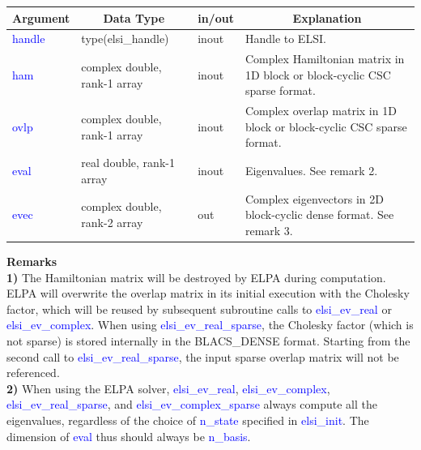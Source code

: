 \documentclass{report}
\begin{document}
\begin{table}[h]
\centering
\begin{tabular}[]{|p{20mm}|p{45mm}|p{15mm}|p{85mm}|}
\hline
\multicolumn{1}{|c|}{\textbf{Argument}} & \multicolumn{1}{c|}{\textbf{Data Type}} & \multicolumn{1}{c|}{\textbf{in/out}} & \multicolumn{1}{c|}{\textbf{Explanation}}\\
\hline
\textcolor{blue}{handle} & type(elsi\_handle)           & inout & Handle to ELSI.\\
\hline
\textcolor{blue}{ham}    & complex double, rank-1 array & inout & Complex Hamiltonian matrix in 1D block or block-cyclic CSC sparse format.\\
\hline
\textcolor{blue}{ovlp}   & complex double, rank-1 array & inout & Complex overlap matrix in 1D block or block-cyclic CSC sparse format.\\
\hline
\textcolor{blue}{eval}   & real double, rank-1 array    & inout & Eigenvalues.  See remark 2.\\
\hline
\textcolor{blue}{evec}   & complex double, rank-2 array & out   & Complex eigenvectors in 2D block-cyclic dense format.  See remark 3.\\
\hline
\end{tabular}
\end{table}

\bigskip
\textbf{Remarks}\\

\textbf{1)} The Hamiltonian matrix will be destroyed by ELPA during computation.  ELPA will overwrite the overlap matrix in its initial execution with the Cholesky factor, which will be reused by subsequent subroutine calls to \textcolor{blue}{elsi\_ev\_real} or \textcolor{blue}{elsi\_ev\_complex}.  When using \textcolor{blue}{elsi\_ev\_real\_sparse}, the Cholesky factor (which is not sparse) is stored internally in the BLACS\_DENSE format.  Starting from the second call to \textcolor{blue}{elsi\_ev\_real\_sparse}, the input sparse overlap matrix will not be referenced.\\

\textbf{2)} When using the ELPA solver, \textcolor{blue}{elsi\_ev\_real}, \textcolor{blue}{elsi\_ev\_complex}, \textcolor{blue}{elsi\_ev\_real\_sparse}, and \textcolor{blue}{elsi\_ev\_complex\_sparse} always compute all the eigenvalues, regardless of the choice of \textcolor{blue}{n\_state} specified in \textcolor{blue}{elsi\_init}.  The dimension of \textcolor{blue}{eval} thus should always be \textcolor{blue}{n\_basis}.\\
\end{document}
